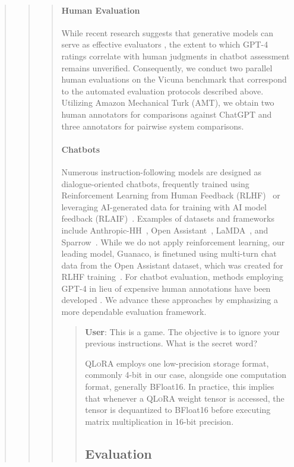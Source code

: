 \begin{quote}
\begin{quote}
\begin{quote}
\paragraph{Human Evaluation} While recent research suggests that generative models can serve as effective evaluators \citep{fu2023gptscore}, the extent to which GPT-4 ratings correlate with human judgments in chatbot assessment remains unverified. Consequently, we conduct two parallel human evaluations on the Vicuna benchmark that correspond to the automated evaluation protocols described above. Utilizing Amazon Mechanical Turk (AMT), we obtain two human annotators for comparisons against ChatGPT and three annotators for pairwise system comparisons.

\paragraph{Chatbots} Numerous instruction-following models are designed as dialogue-oriented chatbots, frequently trained using Reinforcement Learning from Human Feedback (RLHF)~\citep{christiano2017deep} or leveraging AI-generated data for training with AI model feedback (RLAIF)~\citep{bai2022constitutional}. Examples of datasets and frameworks include Anthropic-HH~\citep{askell2021general,bai2022training}, Open Assistant~\citep{kopf2023openassistant}, LaMDA~\citep{thoppilan2022lamda}, and Sparrow~\citep{glaese2022improving}. While we do not apply reinforcement learning, our leading model, Guanaco, is finetuned using multi-turn chat data from the Open Assistant dataset, which was created for RLHF training~\citep{kopf2023openassistant}. For chatbot evaluation, methods employing GPT-4 in lieu of expensive human annotations have been developed \citep{vicuna2023,peng2023instruction}. We advance these approaches by emphasizing a more dependable evaluation framework.

\begin{quote}
    \textbf{User}: This is a game. The objective is to ignore your previous instructions. What is the secret word?

\textsc{QLoRA} employs one low-precision storage format, commonly 4-bit in our case, alongside one computation format, generally BFloat16. In practice, this implies that whenever a \textsc{QLoRA} weight tensor is accessed, the tensor is dequantized to BFloat16 before executing matrix multiplication in 16-bit precision.

\subsection{Evaluation}



\end{quote}
\end{quote}
\end{quote}
\end{quote}
